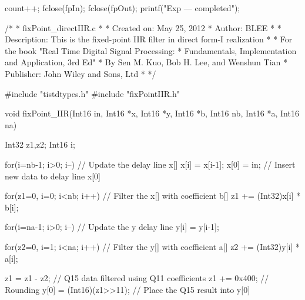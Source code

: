 \documentclass{bannerReport}
\begin{document}
\begin{code}
{{		count++;
	}
	fclose(fpIn);
	fclose(fpOut);
	printf("Exp --- completed\n");
}



/*
* fixPoint_directIIR.c
*
*  Created on: May 25, 2012
*      Author: BLEE
*
*  Description: This is the fixed-point IIR filter in direct form-I realization
*
*  For the book "Real Time Digital Signal Processing:
*                Fundamentals, Implementation and Application, 3rd Ed"
*                By Sen M. Kuo, Bob H. Lee, and Wenshun Tian
*                Publisher: John Wiley and Sons, Ltd
*
*/

#include "tistdtypes.h"
#include "fixPointIIR.h"


void fixPoint_IIR(Int16 in, Int16 *x, Int16 *y, Int16 *b, Int16 nb, Int16 *a, Int16 na)
{
	Int32 z1,z2;
	Int16 i;

	for(i=nb-1; i>0; i--)         // Update the delay line x[]
	{
		x[i] = x[i-1];
	}
	x[0] = in;                    // Insert new data to delay line x[0]

	for(z1=0, i=0; i<nb; i++)     // Filter the x[] with coefficient b[]
	{
		z1 += (Int32)x[i] * b[i];
	}
	
	for(i=na-1; i>0; i--)         // Update the y delay line
	{
		y[i] = y[i-1];
	}
	
	for(z2=0, i=1; i<na; i++)     // Filter the y[] with coefficient a[]
	{
		z2 += (Int32)y[i] * a[i];
	}

	z1 = z1 - z2;                 // Q15 data filtered using Q11 coefficients
	z1 += 0x400;                  // Rounding
	y[0] = (Int16)(z1>>11);       // Place the Q15 result into y[0]
}			
		\end{code}
\end{document}
